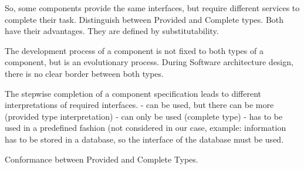 So, some components provide the same interfaces, but require different services to complete their task.
Distinguish between Provided and Complete types. Both have their advantages. They are defined by substitutability. 

The development process of a component is not fixed to both types of a component, but is an evolutionary process.
During Software architecture design, there is no clear border between both types.

The stepwise completion of a component specification leads to different interpretations of required interfaces.
-	can be used, but there can be more (provided type interpretation)
-	can only be used (complete type)
-	has to be used in a predefined fashion (not considered in our case, example: information has to be stored in a database, so the interface of the database must be used.

Conformance between Provided and Complete Types.
